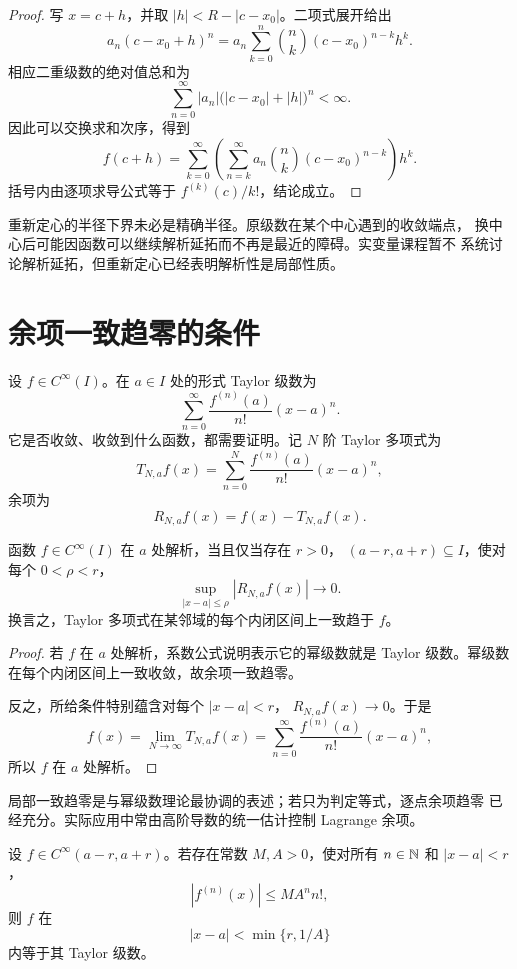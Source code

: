 \begin{proof}
写 \(x=c+h\)，并取 \(|h|<R-|c-x_0|\)。二项式展开给出
\[
 a_n(c-x_0+h)^n
 =a_n\sum_{k=0}^n\binom nk(c-x_0)^{n-k}h^k.
\]
相应二重级数的绝对值总和为
\[
 \sum_{n=0}^\infty |a_n|
 \bigl(|c-x_0|+|h|\bigr)^n<\infty.
\]
因此可以交换求和次序，得到
\[
 f(c+h)
 =\sum_{k=0}^\infty
 \left(
  \sum_{n=k}^\infty a_n\binom nk(c-x_0)^{n-k}
 \right)h^k.
\]
括号内由逐项求导公式等于 \(f^{(k)}(c)/k!\)，结论成立。
\end{proof}

重新定心的半径下界未必是精确半径。原级数在某个中心遇到的收敛端点，
换中心后可能因函数可以继续解析延拓而不再是最近的障碍。实变量课程暂不
系统讨论解析延拓，但重新定心已经表明解析性是局部性质。

\section{余项一致趋零的条件}

设 \(f\in C^\infty(I)\)。在 \(a\in I\) 处的形式 Taylor 级数为
\[
 \sum_{n=0}^\infty\frac{f^{(n)}(a)}{n!}(x-a)^n.
\]
它是否收敛、收敛到什么函数，都需要证明。记 \(N\) 阶 Taylor 多项式为
\[
 T_{N,a}f(x)=\sum_{n=0}^N\frac{f^{(n)}(a)}{n!}(x-a)^n,
\]
余项为
\[
 R_{N,a}f(x)=f(x)-T_{N,a}f(x).
\]

\begin{theorem}
\label{thm:analytic-taylor-remainder}
函数 \(f\in C^\infty(I)\) 在 \(a\) 处解析，当且仅当存在 \(r>0\)，
\((a-r,a+r)\subseteq I\)，使对每个 \(0<\rho<r\)，
\[
 \sup_{|x-a|\le\rho}|R_{N,a}f(x)|\to0.
\]
换言之，Taylor 多项式在某邻域的每个内闭区间上一致趋于 \(f\)。
\end{theorem}

\begin{proof}
若 \(f\) 在 \(a\) 处解析，系数公式说明表示它的幂级数就是 Taylor
级数。幂级数在每个内闭区间上一致收敛，故余项一致趋零。

反之，所给条件特别蕴含对每个 \(|x-a|<r\)，
\(R_{N,a}f(x)\to0\)。于是
\[
 f(x)=\lim_{N\to\infty}T_{N,a}f(x)
 =\sum_{n=0}^\infty\frac{f^{(n)}(a)}{n!}(x-a)^n,
\]
所以 \(f\) 在 \(a\) 处解析。
\end{proof}

局部一致趋零是与幂级数理论最协调的表述；若只为判定等式，逐点余项趋零
已经充分。实际应用中常由高阶导数的统一估计控制 Lagrange 余项。

\begin{theorem}[导数增长的充分条件]
\label{thm:analytic-derivative-growth}
设 \(f\in C^\infty(a-r,a+r)\)。若存在常数 \(M,A>0\)，使对所有
\(n\in\mathbb{N}\) 和 \(|x-a|<r\)，
\[
 |f^{(n)}(x)|\le M A^n n!,
\]
则 \(f\) 在
\[
 |x-a|<\min\{r,1/A\}
\]
内等于其 Taylor 级数。
\end{theorem}


